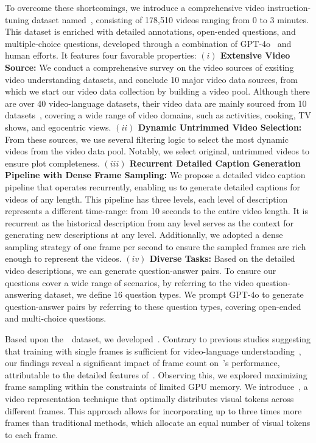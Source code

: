 To overcome these shortcomings, we introduce a comprehensive video instruction-tuning dataset named~\DataName, consisting of 178,510 videos ranging from 0 to 3 minutes. This dataset is enriched with detailed annotations, open-ended questions, and multiple-choice questions, developed through a combination of GPT-4o~\citep{openai2024gpt4o} and human efforts. It features four favorable properties: \textbf{$(i)$ Extensive Video Source:} We conduct a comprehensive survey on the video sources of exsiting video understanding datasets, and conclude 10 major video data sources, from which we start our video data collection by building a video pool.
Although there are over 40 video-language datasets, their video data are mainly sourced from 10 datasets~\citep{Zhou2017YouCookIID,xue2022hdvila,goyal2017something,caba2015activitynet,kay2017kinetics,sigurdsson2016charades,wang2023internvid,shang2019vidor,grauman2022ego4d,zhu2023languagebind}, covering a wide range of video domains, such as activities, cooking, TV shows, and egocentric views.  \textbf{$(ii)$ Dynamic Untrimmed Video Selection:} From these sources, we use several filtering logic to select the most dynamic videos from the video data pool. Notably, we select original, untrimmed videos to ensure plot completeness. \textbf{$(iii)$ Recurrent Detailed Caption Generation Pipeline with Dense Frame Sampling:} We propose a detailed video caption pipeline that operates recurrently, enabling us to generate detailed captions for videos of any length. This pipeline has three levels, each level of description represents a different time-range: from 10 seconds to the entire video length. It is recurrent as the historical description from any level serves as the context for generating new descriptions at any level. Additionally, we adopted a dense sampling strategy of one frame per second to ensure the sampled frames are rich enough to represent the videos. \textbf{$(iv)$ Diverse Tasks:} Based on the detailed video descriptions, we can generate question-answer pairs. To ensure our questions cover a wide range of scenarios, by referring to the video question-answering dataset, we define 16 question types. We prompt GPT-4o to generate question-answer pairs by referring to these question types, covering open-ended and multi-choice questions.

Based upon the~\DataName~dataset, we developed~\ModelName. Contrary to previous studies suggesting that training with single frames is sufficient for video-language understanding~\citep{lei2022revealing}, our findings reveal a significant impact of frame count on~\ModelName's performance, attributable to the detailed features of~\DataName. Observing this, we explored maximizing frame sampling within the constraints of limited GPU memory. We introduce~\MethodName, a video representation technique that optimally distributes visual tokens across different frames. This approach allows for incorporating up to three times more frames than traditional methods, which allocate an equal number of visual tokens to each frame.

